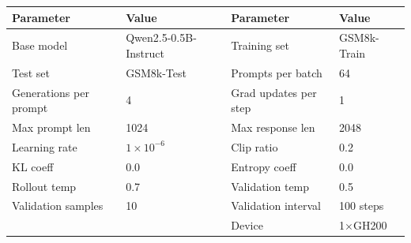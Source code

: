 \documentclass{article}
\theoremstyle{plain}
\theoremstyle{definition}
\theoremstyle{remark}
\begin{document}
\begin{table}[h]
  \centering
  \label{tab:exp-config}
  \begin{tcolorbox}[
    enhanced, hbox,
    title={Training Setup for GSM8k},
    colback=teal!5, colframe=teal, coltext=black, coltitle=white,
    fonttitle=\bfseries, arc=1mm, boxrule=1pt, boxsep=1pt,
    left=2pt, right=2pt, top=0pt, bottom=2pt,
    toptitle=3pt, bottomtitle=3pt, center
  ]
    \small
    \renewcommand{\arraystretch}{1.2}
    \setlength{\tabcolsep}{8pt}
    \begin{tabular}{l|l|l|l}
      \textbf{Parameter} & \textbf{Value} & \textbf{Parameter} & \textbf{Value} \\
      \hline
      Base model & Qwen2.5-0.5B-Instruct & Training set & GSM8k-Train \\
      Test set & GSM8k-Test & Prompts per batch & 64 \\
      Generations per prompt & 4 & Grad updates per step & 1 \\
      Max prompt len & 1024 & Max response len & 2048 \\
      Learning rate & $1 \times 10^{-6}$ & Clip ratio & 0.2 \\
      KL coeff & 0.0 & Entropy coeff & 0.0 \\
      Rollout temp & 0.7 & Validation temp & 0.5 \\
      Validation samples & 10 & Validation interval & 100 steps \\
      & & Device & 1$\times$GH200 \\
    \end{tabular}
  \end{tcolorbox}
\end{table}
\end{document}
